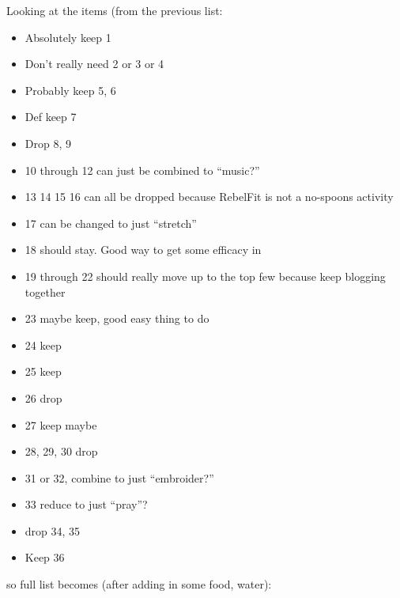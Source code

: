 \documentclass[12pt]{article}
\newcommand{\say}[1]{``#1''}
\renewcommand{\,}{\textsuperscript{,}}
\begin{document}
Looking at the items (from the previous list:

\begin{itemize}

\item Absolutely keep 1  
\item Don't really need 2 or 3 or 4  
\item Probably keep 5, 6  
\item Def keep 7  
\item Drop 8, 9  
\item 10 through 12 can just be combined to \say{music?}  
\item 13 14 15 16 can all be dropped because RebelFit is not a no-spoons activity  
\item 17 can be changed to just \say{stretch}  
\item 18 should stay. Good way to get some efficacy in  
\item 19 through 22 should really move up to the top few because keep blogging together  
\item 23 maybe keep, good easy thing to do  
\item 24 keep  
\item 25 keep  
\item 26 drop  
\item 27 keep maybe  
\item 28, 29, 30 drop  
\item 31 or 32, combine to just \say{embroider?}  
\item 33 reduce to just \say{pray}?  
\item drop 34, 35  
\item Keep 36

\end{itemize}

so full list becomes (after adding in some food, water):
\end{document}
